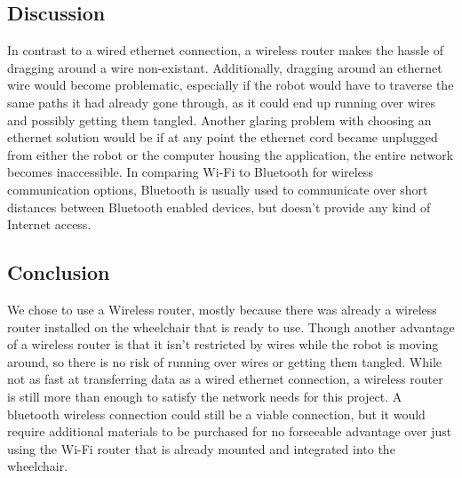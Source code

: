 \documentclass[onecolumn, draftclsnofoot,10pt, compsoc]{IEEEtran}
\begin{document}
\subsection{Discussion}
In contrast to a wired ethernet connection, a wireless router makes the hassle of dragging around a wire non-existant. Additionally, dragging around an ethernet wire would become problematic, especially if the robot would have to traverse the same paths it had already gone through, as it could end up running over wires and possibly getting them tangled. Another glaring problem with choosing an ethernet solution would be if at any point the ethernet cord became unplugged from either the robot or the computer housing the application, the entire network becomes inaccessible. In comparing Wi-Fi to Bluetooth for wireless communication options, Bluetooth is usually used to communicate over short distances between Bluetooth enabled devices, but doesn't provide any kind of Internet access.\cite{Bluetooth_And_Wifi_Difference}

\subsection{Conclusion}
We chose to use a Wireless router, mostly because there was already a wireless router installed on the wheelchair that is ready to use. Though another advantage of a wireless router is that it isn't restricted by wires while the robot is moving around, so there is no risk of running over wires or getting them tangled. While not as fast at transferring data as a wired ethernet connection, a wireless router is still more than enough to satisfy the network needs for this project. A bluetooth wireless connection could still be a viable connection, but it would require additional materials to be purchased for no forseeable advantage over just using the Wi-Fi router that is already mounted and integrated into the wheelchair.



\end{document}
